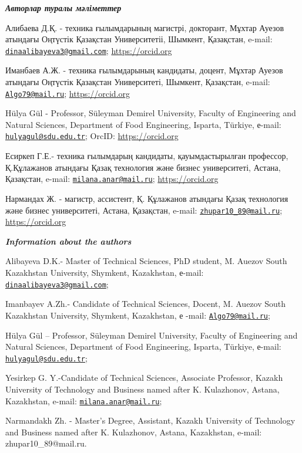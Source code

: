 \begin{authorinfo}
\emph{{\bfseries Авторлар туралы мәліметтер}}

Алибаева Д.Қ. - техника ғылымдарының магистрі, докторант, Мұхтар Ауезов
атындағы Оңтүстік Қазақстан Университетіі, Шымкент, Қазақстан, e-mail:
\href{mailto:dinaalibayeva3@gmail.com}{\nolinkurl{dinaalibayeva3@gmail.com}};
\href{https://orcid.org/0009-0004-2374-064X}{https://orcid.org}

Иманбаев А.Ж. - техника ғылымдарының кандидаты, доцент, Мұхтар Ауезов
атындағы Оңтүстік Қазақстан Университеті, Шымкент, Қазақстан, e-mail:
\href{mailto:Algo79@mail.ru}{\nolinkurl{Algo79@mail.ru}};
\href{https://orcid.org/0000-0003-4443-265X}{https://orcid.org}

Hülya Gül - Professor, Süleyman Demirel University, Faculty of
Engineering and Natural Sciences, Department of Food Engineering,
Isparta, Türkiye, е-mail:
\href{mailto:hulyagul@sdu.edu.tr}{\nolinkurl{hulyagul@sdu.edu.tr}};
OrcID: \href{https://orcid.org/0000-0002-6791-817X}{https://orcid.org}

Есиркеп Г.Е.- техника ғылымдарың кандидаты, қауымдастырылған профессор,
Қ.Құлажанов атындағы Қазақ технология және бизнес университеті, Астана,
Қазақстан, e-mail:
\href{mailto:milana.anar@mail.ru}{\nolinkurl{milana.anar@mail.ru}};
\href{https://orcid.org/0000-0003-2350-1871}{https://orcid.org}

Нармандах Ж. - магистр, ассистент, Қ. Құлажанов атындағы Қазақ
технология және бизнес университеті, Астана, Қазақстан, e-mail:
\href{mailto:zhupar10_89@mail.ru}{\nolinkurl{zhupar10\_89@mail.ru}};
\href{https://orcid.org/0000-0003-3765-2531}{https://orcid.org}

\emph{{\bfseries Information about the authors}}

Alibayeva D.K.- Master of Technical Sciences, PhD student, M. Auezov
South Kazakhstan University, Shymkent, Kazakhstan, е-mail:
\href{mailto:dinaalibayeva3@gmail.com}{\nolinkurl{dinaalibayeva3@gmail.com}};

Imanbayev A.Zh.- Candidate of Technical Sciences, Docent, M. Auezov
South Kazakhstan University, Shymkent, Kazakhstan, е -mail:
\href{mailto:Algo79@mail.ru}{\nolinkurl{Algo79@mail.ru}};

Hülya Gül -- Professor, Süleyman Demirel University, Faculty of
Engineering and Natural Sciences, Department of Food Engineering,
Isparta, Türkiye, е-mail:
\href{mailto:hulyagul@sdu.edu.tr}{\nolinkurl{hulyagul@sdu.edu.tr}};

Yesirkep G. Y.-Candidate of Technical Sciences, Associate Professor,
Kazakh University of Technology and Business named after K. Kulazhonov,
Astana, Kazakhstan, e-mail:
\href{mailto:milana.anar@mail.ru}{\nolinkurl{milana.anar@mail.ru}};

Narmandakh Zh. - Master's Degree, Assistant, Kazakh University of
Technology and Business named after K. Kulazhonov, Astana, Kazakhstan,
e-mail: zhupar10\_89@mail.ru.
\end{authorinfo}

